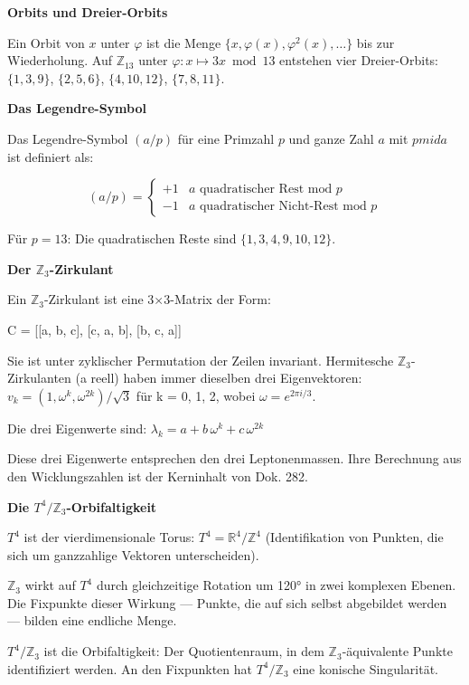 \documentclass[11pt,oneside]{book}
\begin{document}
\textbf{Orbits und Dreier-Orbits}


Ein Orbit von $x$ unter $\varphi$ ist die Menge $\{x, \varphi(x), \varphi^2(x), \ldots\}$ bis
zur Wiederholung. Auf $\mathbb{Z}_{13}$ unter $\varphi: x \mapsto 3x \bmod 13$ entstehen
vier Dreier-Orbits: $\{1,3,9\}$, $\{2,5,6\}$, $\{4,10,12\}$, $\{7,8,11\}$.


\textbf{Das Legendre-Symbol}


Das Legendre-Symbol $(a/p)$ für eine Primzahl $p$ und ganze Zahl $a$ mit $p 
mid a$ ist definiert als:


\[(a/p) = \begin{cases} +1 & a \text{ quadratischer Rest mod } p \\ -1 & a \text{ quadratischer Nicht-Rest mod } p \end{cases}\]


Für $p = 13$: Die quadratischen Reste sind $\{1, 3, 4, 9, 10, 12\}$.


\textbf{Der $\mathbb{Z}_3$-Zirkulant}


Ein $\mathbb{Z}_3$-Zirkulant ist eine 3$\times$3-Matrix der Form:


C = [[a, b, c], [c, a, b], [b, c, a]]


Sie ist unter zyklischer Permutation der Zeilen invariant. Hermitesche
$\mathbb{Z}_3$-Zirkulanten (a reell) haben immer dieselben drei Eigenvektoren:
$v_k = (1, \omega^{k}, \omega^{2k})/\sqrt{3}$ für k = 0, 1, 2, wobei $\omega = e^{2\pi i/3}$.


Die drei Eigenwerte sind:
$\lambda_k = a + b\,\omega^{k} + c\,\omega^{2k}$


Diese drei Eigenwerte entsprechen den drei Leptonenmassen. Ihre
Berechnung aus den Wicklungszahlen ist der Kerninhalt von Dok. 282.


\textbf{Die $T^4/\mathbb{Z}_3$-Orbifaltigkeit}


$T^4$ ist der vierdimensionale Torus: $T^4 = \mathbb{R}^4/\mathbb{Z}^4$ (Identifikation
von Punkten, die sich um ganzzahlige Vektoren unterscheiden).


$\mathbb{Z}_3$ wirkt auf $T^4$ durch gleichzeitige Rotation um 120° in zwei
komplexen Ebenen. Die Fixpunkte dieser Wirkung — Punkte, die auf
sich selbst abgebildet werden — bilden eine endliche Menge.


$T^4/\mathbb{Z}_3$ ist die Orbifaltigkeit: Der Quotientenraum, in dem $\mathbb{Z}_3$-äquivalente
Punkte identifiziert werden. An den Fixpunkten hat $T^4/\mathbb{Z}_3$ eine
konische Singularität.
\end{document}
